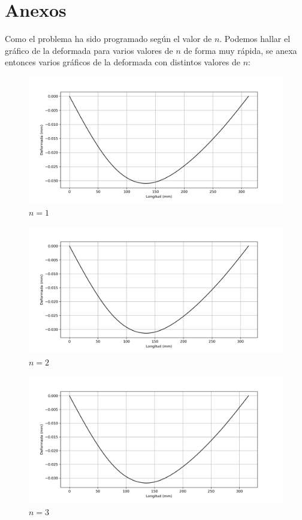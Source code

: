 \documentclass[a4paper,11pt]{report}
\begin{document}
\chapter{Anexos}
Como el problema ha sido programado según el valor de $n$. Podemos hallar el gráfico de la deformada para varios valores de $n$ de forma muy rápida, se anexa entonces varios gráficos de la deformada con distintos valores de $n$:
\begin{figure}[H]
\centering
\includegraphics[scale=0.68]{defj1.png}
\caption{$n = 1$}
\end{figure}
\begin{figure}[H]
\centering
\includegraphics[scale=0.68]{defj2.png}
\caption{$n = 2$}
\end{figure}
\begin{figure}[H]
\centering
\includegraphics[scale=0.68]{defj3.png}
\caption{$n = 3$}
\end{figure}
\end{document}
